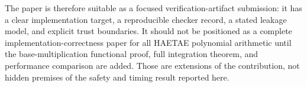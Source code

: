 \documentclass[10pt,twocolumn]{article}
\begin{document}
The paper is therefore suitable as a focused verification-artifact submission:
it has a clear implementation target, a reproducible checker record, a stated
leakage model, and explicit trust boundaries.  It should not be positioned as a
complete implementation-correctness paper for all HAETAE polynomial arithmetic
until the base-multiplication functional proof, full integration theorem, and
performance comparison are added.  Those are extensions of the contribution,
not hidden premises of the safety and timing result reported here.



\end{document}

